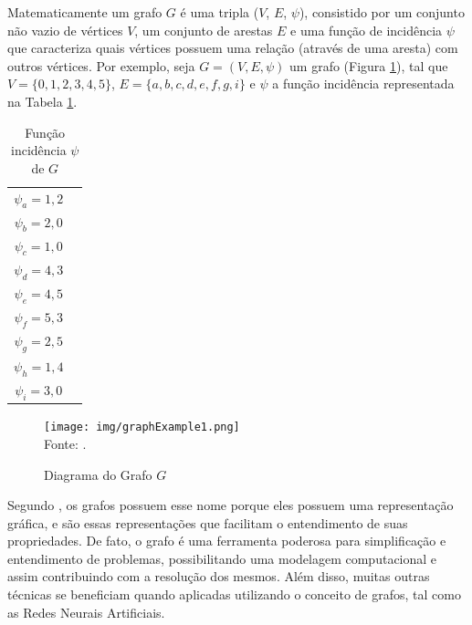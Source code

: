 Matematicamente um grafo $G$ é uma tripla ($V$, $E$, $\psi$), consistido por um conjunto não vazio de vértices $V$, um conjunto de arestas $E$ e uma função de incidência $\psi$ que caracteriza quais vértices possuem uma relação (através de uma aresta) com outros vértices. Por exemplo, seja $G = (V, E, \psi)$ um grafo (Figura \ref{fig:graphExample1}), tal que $V = \{0, 1, 2, 3, 4, 5\}$, $E = \{a, b, c, d, e, f, g, i\}$ e $\psi$ a função incidência representada na Tabela \ref{tab:graphExample1}.

\begin{table}[ht!]
\caption{Função incidência $\psi$ de $G$}
\label{tab:graphExample1}
\centering
\begin{tabular}{| c | c |}
\hline
    $\psi_a = 1,2$\\ 
    $\psi_b = 2,0$\\ 
    $\psi_c = 1,0$\\ 
    $\psi_d = 4,3$\\
    $\psi_e = 4,5$\\
    $\psi_f = 5,3$\\
    $\psi_g = 2,5$\\
    $\psi_h = 1,4$\\
    $\psi_i = 3,0$\\
\hline
\end{tabular}
{\fontsize{11pt}{\baselineskip}\selectfont
}
\end{table}

\begin{figure}[ht!]
\caption{Diagrama do Grafo $G$}
\label{fig:graphExample1}
\centering
\texttt{[image: img/graphExample1.png]}
{\fontsize{11pt}{\baselineskip}\selectfont
\\Fonte: \cite{graphOnline}.
}
\end{figure}

Segundo \cite{Bondy1976}, os grafos possuem esse nome porque eles possuem uma representação gráfica, e são essas representações que facilitam o entendimento de suas propriedades. De fato, o grafo é uma ferramenta poderosa para simplificação e entendimento de problemas, possibilitando uma modelagem computacional e assim contribuindo com a resolução dos mesmos. Além disso, muitas outras técnicas se beneficiam quando aplicadas utilizando o conceito de grafos, tal como as Redes Neurais Artificiais.

